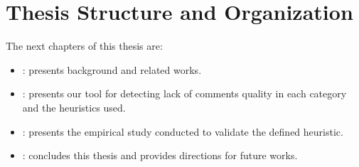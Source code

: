 \section{Thesis Structure and Organization}
The next chapters of this thesis are:

\begin{itemize}
\item {}: presents background and related works.
\item {}: presents our tool for detecting lack of comments quality in each category and the heuristics used.
\item {}: presents the empirical study conducted to validate the
defined heuristic.
\item {}: concludes this thesis and provides directions for future works.
\end{itemize}
